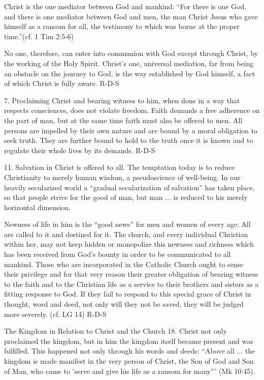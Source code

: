 \documentclass[oneside]{book}
\begin{document}
Christ is the one mediator between God and mankind: ``For there is one God, and
there is one mediator between God and men, the man Christ Jesus who gave himself
as a ransom for all, the testimony to which was borne at the proper
time.''(cf. 1 Tim 2:5-6)

No one, therefore, can enter into communion with God except through Christ, by
the working of the Holy Spirit. Christ's one, universal mediation, far from
being an obstacle on the journey to God, is the way established by God himself,
a fact of which Christ is fully aware.
R-D-S

7. Proclaiming Christ and bearing witness to him, when done in a way that
respects consciences, does not violate freedom. Faith demands a free adherence
on the part of man, but at the same time faith must also be offered to men. All
persons are impelled by their own nature and are bound by a moral obligation to
seek truth. They are further bound to hold to the truth once it is known and to
regulate their whole lives by its demands.
R-D-S

11. Salvation in Christ is offered to all. The temptation today is to reduce
Christianity to merely human wisdom, a pseudoscience of well-being. In our
heavily secularized world a ``gradual secularization of salvation'' has taken
place, so that people strive for the good of man, but man ... is reduced to his
merely horizontal dimension.

Newness of life in him is the ``good news'' for men and women of every age: All
are called to it and destined for it. The church, and every individual Christian
within her, may not keep hidden or monopolize this newness and richness which
has been received from God's bounty in order to be communicated to all
mankind. Those who are incorporated in the Catholic Church ought to sense their
privilege and for that very reason their greater obligation of bearing witness
to the faith and to the Christian life as a service to their brothers and
sisters as a fitting response to God. If they fail to respond to this special
grace of Christ in thought, word and deed, not only will they not be saved, they
will be judged more severely. (cf. LG 14)
R-D-S

The Kingdom in Relation to Christ and the Church
18. Christ not only proclaimed the kingdom, but in him the kingdom itself became
present and was fulfilled. This happened not only through his words and deeds:
``Above all ... the kingdom is made manifest in the very person of Christ, the
Son of God and Son of Man, who came to 'serve and give his life as a ransom for
many''' (Mk 10:45).
\end{document}

